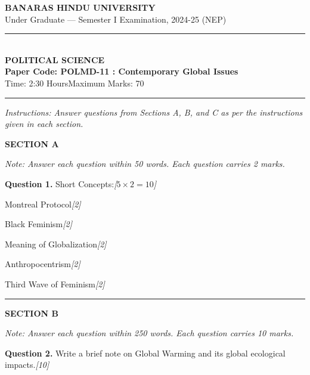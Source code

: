 \documentclass[11pt,a4paper]{article}
\newcommand{\pts}[1]{\hfill   \textit{[#1]}}
\begin{document}
\begin{center}
  {\large\bfseries BANARAS HINDU UNIVERSITY}\\[2pt]
  {\normalsize Under Graduate --- Semester I Examination, 2024-25 (NEP)}\\[6pt]
  \rule{0.8\linewidth}{0.5pt}\\[6pt]
  {\large\bfseries POLITICAL SCIENCE}\\[4pt]
  {\large\bfseries Paper Code: POLMD-11 : Contemporary Global Issues}\\[4pt]
  {\normalsize Time: 2:30 Hours\hfill Maximum Marks: 70}
\end{center}

\rule{\linewidth}{0.4pt}

\smallskip



\noindent   \textit{Instructions: Answer questions from Sections A, B, and C as per the instructions given in each section.}

\bigskip

\centerline{   \textbf{SECTION A}}
\smallskip



\noindent   \textit{Note: Answer each question within 50 words. Each question carries 2 marks.}

\bigskip




\noindent   \textbf{Question 1.} Short Concepts:\pts{$5  \times 2 = 10$}

\begin{parts}
  \item Montreal Protocol\pts{2}
  \item Black Feminism\pts{2}
  \item Meaning of Globalization\pts{2}
  \item Anthropocentrism\pts{2}
  \item Third Wave of Feminism\pts{2}
\end{parts}

\bigskip
\rule{\linewidth}{0.2pt}
\medskip

\centerline{   \textbf{SECTION B}}
\smallskip



\noindent   \textit{Note: Answer each question within 250 words. Each question carries 10 marks.}

\bigskip




\noindent   \textbf{Question 2.} Write a brief note on Global Warming and its global ecological impacts.\pts{10}
\end{document}
